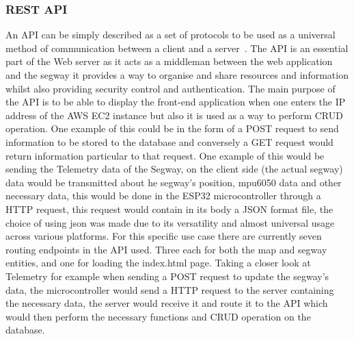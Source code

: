 \subsubsection*{REST API}
An API can be simply described as a set of protocols to be used as a universal method of communication between a client and a server~\cite{ref:restapi}. The API is an essential part of the Web server as it acts as a middleman between the web application and the segway it provides a way to organise and share resources and information whilst also providing security control and authentication. 
The main purpose of the API is to be able to display the front-end application when one enters the IP address of the AWS EC2 instance but also it is used as a way to perform CRUD operation. One example of this could be in the form of a POST request to send information to be stored to the database and conversely a GET request would return information particular to that request. One example of this would be sending the Telemetry data of the Segway, on the client side (the actual segway) data would be transmitted about he segway’s position, mpu6050 data and other necessary data, this would be done in the ESP32 microcontroller through a HTTP request, this request would contain in its body a JSON format file, the choice of using json was made due to its versatility and almost universal usage across various platforms.
For this specific use case there are currently seven routing endpoints in the API used. Three each for both the map and segway entities, and one for loading the index.html page. Taking a closer look at Telemetry for example when sending a POST request to update the segway’s data, the microcontroller would send a HTTP request to the server containing the necessary data, the server would receive it and route it to the API which would then perform the necessary functions and CRUD operation on the database.
